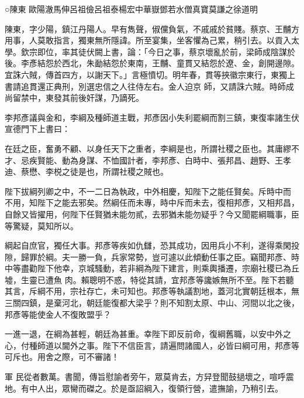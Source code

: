 
\begin{pinyinscope}

 ○陳東
 歐陽澈馬伸呂祖儉呂祖泰楊宏中華嶽鄧若水僧真寶莫謙之徐道明



 陳東，字少陽，鎮江丹陽人。早有雋聲，俶儻負氣，不戚戚於貧賤。蔡京、王黼方用事，人莫敢指言，獨東無所隱諱。所至宴集，坐客懼為己累，稍引去。以貢入太學。欽宗即位，率其徒伏闕上書，論：「今日之事，蔡京壞亂於前，梁師成陰謀於後。李彥結怨於西北，朱勔結怨於東南，王黼、童貫又結怨於遼、金，創開邊隙。宜誅六賊，傳首四方，以謝天下。」言極憤切。明年春，貫等挾徽宗東行，東獨上書請追貫還正典刑，別選忠信之人往侍左右。金人迫京
 師，又請誅六賊。時師成尚留禁中，東發其前後奸謀，乃謫死。



 李邦彥議與金和，李綱及種師道主戰，邦彥因小失利罷綱而割三鎮，東復率諸生伏宣德門下上書曰：



 在廷之臣，奮勇不顧、以身任天下之重者，李綱是也，所謂社稷之臣也。其庸繆不才、忌疾賢能、動為身謀、不恤國計者，李邦彥、白時中、張邦昌、趙野、王孝迪、蔡懋、李棁之徒是也，所謂社稷之賊也。



 陛下拔綱列卿之中，不一二日為執政，中外相慶，知陛下之能任賢矣。斥時中而
 不用，知陛下之能去邪矣。然綱任而未專，時中斥而未去，復相邦彥，又相邦昌，自餘又皆擢用，何陛下任賢猶未能勿貳，去邪猶未能勿疑乎？今又聞罷綱職事，臣等驚疑，莫知所以。



 綱起自庶官，獨任大事。邦彥等疾如仇讎，恐其成功，因用兵小不利，遂得乘閑投隙，歸罪於綱。夫一勝一負，兵家常勢，豈可遽以此傾動任事之臣。竊聞邦彥、時中等盡勸陛下他幸，京城騷動，若非綱為陛下建言，則乘輿播遷，宗廟社稷已為丘墟，生靈已遭魚
 肉。賴聰明不惑，特從其請，宜邦彥等讒嫉無所不至。陛下若聽其言，斥綱不用，宗社存亡，未可知也。邦彥等執議割地，蓋河北實朝廷根本，無三關四鎮，是棄河北，朝廷能復都大梁乎？則不知割太原、中山、河間以北之後，邦彥等能使金人不復敗盟乎？



 一進一退，在綱為甚輕，朝廷為甚重。幸陛下即反前命，復綱舊職，以安中外之心，付種師道以閫外之事。陛下不信臣言，請遍問諸國人，必皆曰綱可用，邦彥等可斥也。用舍之際，可不審諸！



 軍
 民從者數萬。書聞，傳旨慰諭者旁午，眾莫肯去，方舁登聞鼓撾壞之，喧呼震地。有中人出，眾臠而磔之。於是亟詔綱入，復領行營，遣撫諭，乃稍引去。




\end{pinyinscope}
